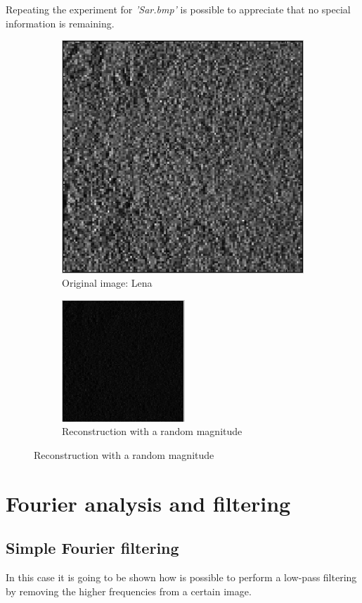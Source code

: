 \documentclass[a4paper, 10pt, conference] {article}
\begin{document}
 Repeating the experiment for \textit{'Sar.bmp'} is possible to appreciate that no special information is remaining.
 \begin{figure}[H]
 	\centering
 	\begin{subfigure}{0.49\textwidth} 
 		\centering						
 		\includegraphics[scale=0.5]{reportImages/exp1_sar.PNG}
 		\caption{Original image: Lena}
 	\end{subfigure}
 	\begin{subfigure}{0.49\textwidth}
 		\centering
 		\includegraphics[scale=1]{reportImages/exp1_sar_random_mag.PNG}
 		\caption{Reconstruction with a random magnitude}
 	\end{subfigure}
 	\label{exp1_4}
 \end{figure}

\section{Fourier analysis and filtering}
\subsection{Simple Fourier filtering}
In this case it is going to be shown how is possible to perform a low-pass filtering by removing the higher frequencies from a certain image.
\end{document}
